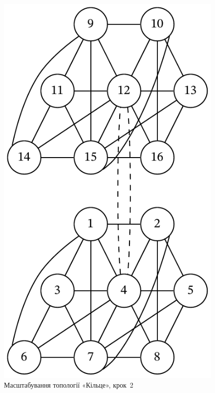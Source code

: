\documentclass[
	a4paper,
	oneside,
	BCOR = 10mm,
	DIV = 12,
	12pt,
	headings = normal,
]{scrartcl}
\begin{document}
				\begin{figure}[!htbp]
					\centering
					\includegraphics[height=12\baselineskip]{./assets/cluster-08-04-ring-s02.pdf}
					\caption{Масштабування топології «Кільце», крок~2}
					\label{fig:cluster-08-04-ring-s02}
				\end{figure}
\end{document}
